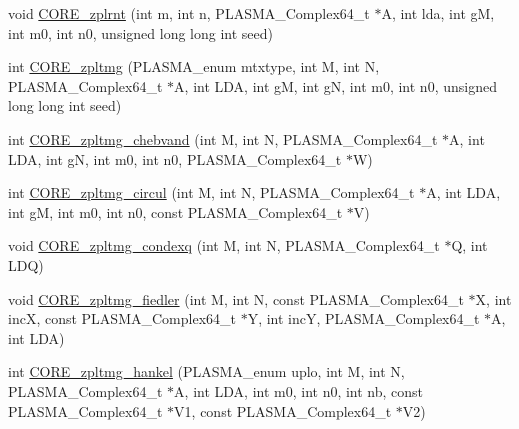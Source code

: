 \begin{DoxyCompactItemize}
\item 
void \hyperlink{group__CORE__PLASMA__Complex64__t_ga878489999e64a78890bffaf62e40351e_ga878489999e64a78890bffaf62e40351e}{C\+O\+R\+E\+\_\+zplrnt} (int m, int n, P\+L\+A\+S\+M\+A\+\_\+\+Complex64\+\_\+t $\ast$A, int lda, int g\+M, int m0, int n0, unsigned long long int seed)
\item 
int \hyperlink{group__CORE__PLASMA__Complex64__t_gab8c467efe3705c1abf0b381d319c0a3a_gab8c467efe3705c1abf0b381d319c0a3a}{C\+O\+R\+E\+\_\+zpltmg} (P\+L\+A\+S\+M\+A\+\_\+enum mtxtype, int M, int N, P\+L\+A\+S\+M\+A\+\_\+\+Complex64\+\_\+t $\ast$A, int L\+D\+A, int g\+M, int g\+N, int m0, int n0, unsigned long long int seed)
\item 
int \hyperlink{group__CORE__PLASMA__Complex64__t_gaaa11019d54464fc0aa69fe291aa000e3_gaaa11019d54464fc0aa69fe291aa000e3}{C\+O\+R\+E\+\_\+zpltmg\+\_\+chebvand} (int M, int N, P\+L\+A\+S\+M\+A\+\_\+\+Complex64\+\_\+t $\ast$A, int L\+D\+A, int g\+N, int m0, int n0, P\+L\+A\+S\+M\+A\+\_\+\+Complex64\+\_\+t $\ast$W)
\item 
int \hyperlink{group__CORE__PLASMA__Complex64__t_ga5d39fbd418b05467723a2ae4f37b292a_ga5d39fbd418b05467723a2ae4f37b292a}{C\+O\+R\+E\+\_\+zpltmg\+\_\+circul} (int M, int N, P\+L\+A\+S\+M\+A\+\_\+\+Complex64\+\_\+t $\ast$A, int L\+D\+A, int g\+M, int m0, int n0, const P\+L\+A\+S\+M\+A\+\_\+\+Complex64\+\_\+t $\ast$V)
\item 
void \hyperlink{group__CORE__PLASMA__Complex64__t_gad800f86846d872c14d2284b2262a551f_gad800f86846d872c14d2284b2262a551f}{C\+O\+R\+E\+\_\+zpltmg\+\_\+condexq} (int M, int N, P\+L\+A\+S\+M\+A\+\_\+\+Complex64\+\_\+t $\ast$Q, int L\+D\+Q)
\item 
void \hyperlink{group__CORE__PLASMA__Complex64__t_gad8f5e5794f8c6e42b9f8f09a2f5bacac_gad8f5e5794f8c6e42b9f8f09a2f5bacac}{C\+O\+R\+E\+\_\+zpltmg\+\_\+fiedler} (int M, int N, const P\+L\+A\+S\+M\+A\+\_\+\+Complex64\+\_\+t $\ast$X, int inc\+X, const P\+L\+A\+S\+M\+A\+\_\+\+Complex64\+\_\+t $\ast$Y, int inc\+Y, P\+L\+A\+S\+M\+A\+\_\+\+Complex64\+\_\+t $\ast$A, int L\+D\+A)
\item 
int \hyperlink{group__CORE__PLASMA__Complex64__t_ga89491a9e2c2cdd7cb7de51f854504698_ga89491a9e2c2cdd7cb7de51f854504698}{C\+O\+R\+E\+\_\+zpltmg\+\_\+hankel} (P\+L\+A\+S\+M\+A\+\_\+enum uplo, int M, int N, P\+L\+A\+S\+M\+A\+\_\+\+Complex64\+\_\+t $\ast$A, int L\+D\+A, int m0, int n0, int nb, const P\+L\+A\+S\+M\+A\+\_\+\+Complex64\+\_\+t $\ast$V1, const P\+L\+A\+S\+M\+A\+\_\+\+Complex64\+\_\+t $\ast$V2)
\item 

\end{DoxyCompactItemize}
